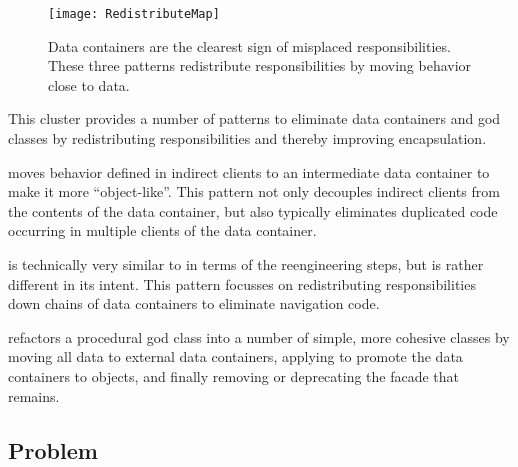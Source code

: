 \documentclass[a4paper,10pt,twoside]{book}
\begin{document}
\begin{figure}[h]
\begin{center}
\texttt{[image: RedistributeMap]}
\caption{Data containers are the clearest sign of misplaced responsibilities. These three patterns redistribute responsibilities by moving behavior close to data.}
\end{center}
\end{figure}

This cluster provides a number of patterns to eliminate data containers and god classes by redistributing responsibilities and thereby improving encapsulation.

\begin{bulletlist}
\item {} moves behavior defined in indirect clients to an intermediate data container to make it more ``object-like''. This pattern not only decouples indirect clients from the contents of the data container, but also typically eliminates duplicated code occurring in multiple clients of the data container.

\item {} is technically very similar to  in terms of the reengineering steps, but is rather different in its intent. This pattern focusses on redistributing responsibilities down chains of data containers to eliminate navigation code.

\item {} refactors a procedural god class into a number of simple, more cohesive classes by moving all data to external data containers, applying  to promote the data containers to objects, and finally removing or deprecating the facade that remains.
\end{bulletlist}




\subsection*{Problem}
\end{document}
